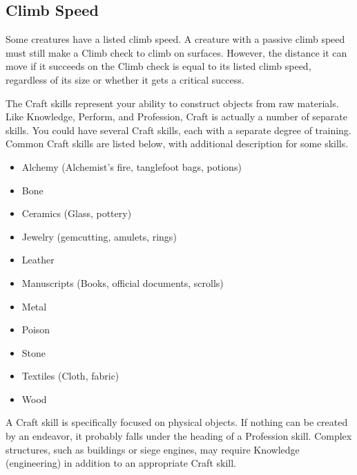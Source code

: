     \subsection{Climb Speed}\label{Climb Speed}
        Some creatures have a listed climb speed.
        A creature with a passive climb speed must still make a Climb check to climb on surfaces.
        However, the distance it can move if it succeeds on the Climb check is equal to its listed climb speed, regardless of its size or whether it gets a critical success.

\newpage
{}
    The Craft skills represent your ability to construct objects from raw materials.
    Like Knowledge, Perform, and Profession, Craft is actually a number of separate skills.
    You could have several Craft skills, each with a separate degree of training.
    Common Craft skills are listed below, with additional description for some skills.

    \begin{itemize}
        \item Alchemy (Alchemist's fire, tanglefoot bags, potions)
        \item Bone
        \item Ceramics (Glass, pottery)
        \item Jewelry (gemcutting, amulets, rings)
        \item Leather
        \item Manuscripts (Books, official documents, scrolls)
        \item Metal
        \item Poison
        \item Stone
        \item Textiles (Cloth, fabric)
        \item Wood
    \end{itemize}

    A Craft skill is specifically focused on physical objects. If nothing can be created by an endeavor, it probably falls under the heading of a Profession skill. Complex structures, such as buildings or siege engines, may require Knowledge (engineering) in addition to an appropriate Craft skill.

